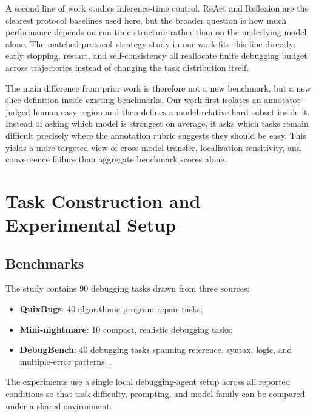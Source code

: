 \documentclass{article}
\begin{document}
A second line of work studies inference-time control. ReAct and Reflexion are the clearest protocol baselines used here, but the broader question is how much performance depends on run-time structure rather than on the underlying model alone. The matched protocol--strategy study in our work fits this line directly: early stopping, restart, and self-consistency all reallocate finite debugging budget across trajectories instead of changing the task distribution itself.

The main difference from prior work is therefore not a new benchmark, but a new slice definition inside existing benchmarks. Our work first isolates an annotator-judged human-easy region and then defines a model-relative hard subset inside it. Instead of asking which model is strongest on average, it asks which tasks remain difficult precisely where the annotation rubric suggests they should be easy. This yields a more targeted view of cross-model transfer, localization sensitivity, and convergence failure than aggregate benchmark scores alone.

\section{Task Construction and Experimental Setup}

\subsection{Benchmarks}

The study contains 90 debugging tasks drawn from three sources:
\begin{itemize}
    \item \textbf{QuixBugs}: 40 algorithmic program-repair tasks;
    \item \textbf{Mini-nightmare}: 10 compact, realistic debugging tasks;
    \item \textbf{DebugBench}: 40 debugging tasks spanning reference, syntax, logic, and multiple-error patterns~\citep{wu2024debugbench}.
\end{itemize}

The experiments use a single local debugging-agent setup across all reported conditions so that task difficulty, prompting, and model family can be compared under a shared environment.
\end{document}
